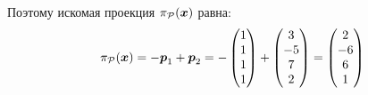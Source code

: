 \documentclass[a4paper,12pt]{article}
\begin{document}
\begin{solution}
    Поэтому искомая проекция $\pi_{\mathcal P}(\boldsymbol x)$ равна:
    \[
      \pi_{\mathcal P}(\boldsymbol x) = -\boldsymbol p_1 + \boldsymbol p_2
      = -\begin{pmatrix} 1 \\ 1 \\ 1 \\ 1 \end{pmatrix} + \begin{pmatrix} 3 \\ -5 \\ 7 \\ 2\end{pmatrix}
      = \begin{pmatrix} 2 \\ -6 \\ 6 \\ 1 \end{pmatrix}
    \]
  \end{solution}
\end{document}
